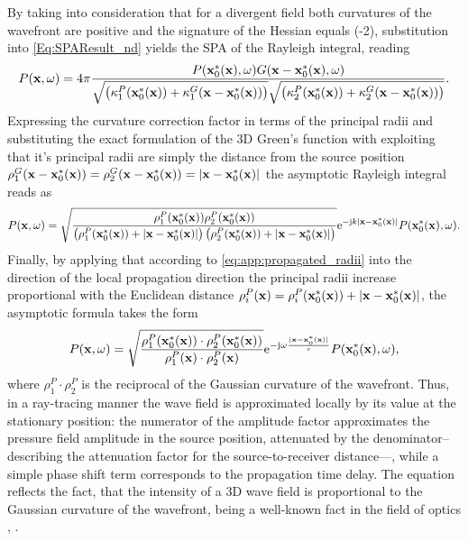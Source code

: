 By taking into consideration that for a divergent field both curvatures of the wavefront are positive and the signature of the Hessian equals (-2), substitution into \eqref{Eq:SPAResult_nd} yields the SPA of the Rayleigh integral, reading
\begin{equation}
\label{eq:HF_approx:asymptotic_rayleigh}
P(\mathbf{x},\omega) = 4\pi \frac{P(\mathbf{x}_0^*(\mathbf{x}),\omega) G(\mathbf{x}-\mathbf{x}_0^*(\mathbf{x}),\omega)}
{
\sqrt{\left(\kappa_1^P(\mathbf{x}_0^*(\mathbf{x})) + \kappa_1^G(\mathbf{x}-\mathbf{x}_0^*(\mathbf{x}))\right)}
\sqrt{\left(\kappa_2^P(\mathbf{x}_0^*(\mathbf{x})) + \kappa_2^G(\mathbf{x}-\mathbf{x}_0^*(\mathbf{x}))\right)}
}.
\end{equation}
Expressing the curvature correction factor in terms of the principal radii and substituting the exact formulation of the 3D Green's function with exploiting that it's principal radii are simply the distance from the source position $\rho_1^G(\mathbf{x}-\mathbf{x}_0^*(\mathbf{x})) = \rho_2^G(\mathbf{x}-\mathbf{x}_0^*(\mathbf{x})) = |\mathbf{x}-\mathbf{x}_0^*(\mathbf{x})|$ the asymptotic Rayleigh integral reads as
\begin{equation}
\label{eq:HF_approx:ray_propagation_a}
\small
P(\mathbf{x},\omega) =
\sqrt{ \frac{ \rho_1^P(\mathbf{x}_0^*(\mathbf{x})) \rho_2^P(\mathbf{x}_0^*(\mathbf{x})) }{ \left(\rho_1^P(\mathbf{x}_0^*(\mathbf{x})) + |\mathbf{x}-\mathbf{x}_0^*(\mathbf{x})| \right) \left(\rho_2^P(\mathbf{x}_0^*(\mathbf{x})) + |\mathbf{x}-\mathbf{x}_0^*(\mathbf{x})|\right) } }
\mathrm{e}^{-\mathrm{j} k |\mathbf{x}-\mathbf{x}_0^*(\mathbf{x})| } P(\mathbf{x}_0^*(\mathbf{x}),\omega) .
\end{equation}
Finally, by applying that according to \eqref{eq:app:propagated_radii} into the direction of the local propagation direction the principal radii increase proportional with the Euclidean distance $\rho_i^P(\mathbf{x}) = \rho_i^P(\mathbf{x}_0^*(\mathbf{x})) + |\mathbf{x}-\mathbf{x}_0^*(\mathbf{x})|$, the asymptotic formula takes the form
\begin{equation}
\label{eq:HF_approx:ray_propagation}
P(\mathbf{x},\omega) =
\sqrt{ \frac{ \rho_1^P(\mathbf{x}_0^*(\mathbf{x})) \cdot \rho_2^P(\mathbf{x}_0^*(\mathbf{x})) }{ \rho^P_1(\mathbf{x}) \cdot \rho^P_2(\mathbf{x}) } }
\mathrm{e}^{-\mathrm{j} \omega \frac{|\mathbf{x}-\mathbf{x}_0^*(\mathbf{x})| }{c} } P(\mathbf{x}_0^*(\mathbf{x}),\omega),
\end{equation}
where $\rho^P_1 \cdot \rho^P_2$ is the reciprocal of the Gaussian curvature of the wavefront.
Thus, in a ray-tracing manner the wave field is approximated locally by its value at the stationary position: 
the numerator of the amplitude factor approximates the pressure field amplitude in the source position, attenuated by the denominator--describing the attenuation factor for the source-to-receiver distance---, while a simple phase shift term corresponds to the propagation time delay.
The equation reflects the fact, that the intensity of a 3D wave field is proportional to the Gaussian curvature of the wavefront, being a well-known fact in the field of optics \cite[Sec. 3.1]{Born1970}, \cite[Sec. 1.3]{Bouche1997}.

